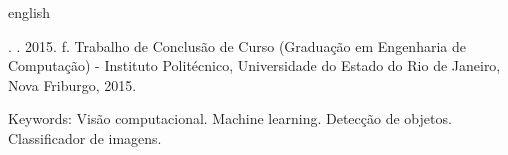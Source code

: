 
\begin{resumo}[Abstract]
\begin{otherlanguage*}{english}

\noindent
\entradaAutor{}. \textit{\englishTitle{}}. 2015. \pageref{LastPage} f. Trabalho de Conclusão de Curso (Graduação em Engenharia de Computação) - Instituto Politécnico, Universidade do Estado do Rio de Janeiro, Nova Friburgo, 2015.
\vspace{\onelineskip}

\setlength{\parindent}{1.3cm}
\lipsum[1]

\vspace{\onelineskip}
\noindent Keywords: Visão computacional. Machine learning. Detecção de objetos. Classificador de imagens.

\end{otherlanguage*}
\end{resumo}